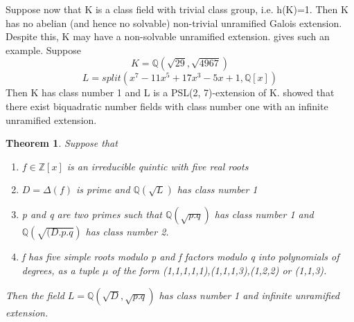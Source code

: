 \documentclass[preprint,12pt,reqno]{elsarticle}
\newtheorem{theorem}{Theorem}
\begin{document}
Suppose now that K is a class field with trivial class group, i.e. h(K)=1. Then K has no abelian (and hence no
solvable) non-trivial unramified Galois extension. Despite this, K may have a non-solvable unramified extension. \cite{BRIN} gives such an example. Suppose
\begin{equation}
   K=\mathbb{Q}(\sqrt{29},\sqrt{4967}) 
\end{equation}
\begin{equation}
   L=split(x^7 - 11x^5 + 17x^3 - 5x + 1,\mathbb{Q}[x])
\end{equation}
Then K has class number 1 and L is a PSL(2, 7)-extension of K.
\cite{MAIR} showed that there exist biquadratic number fields with class number one with an infinite unramified extension. 
\begin{theorem}
\cite{BRIN} Suppose that \begin{enumerate}
    \item $f\in \mathbb{Z}[x]$ is an irreducible quintic with five real roots
    \item $D=\Delta(f)$ is prime and $\mathbb{Q}(\sqrt{L})$ has class number 1
    \item p and q are two primes such that $\mathbb{Q}(\sqrt{p.q})$ has class number 1 and $\mathbb{Q}(\sqrt{(D.p.q})$ has class number 2.
    \item f has five simple roots modulo p and f factors modulo q into polynomials of degrees, as a tuple $\mu$ of the form (1,1,1,1,1),(1,1,1,3),(1,2,2) or (1,1,3).
\end{enumerate}
Then the field $L=\mathbb{Q}(\sqrt{D},\sqrt{p.q})$ has class number 1 and infinite unramified extension.
\end{theorem}
\end{document}
